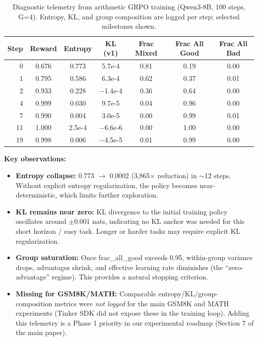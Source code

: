 \documentclass{article}
\begin{document}
\begin{table}[htbp]
    \centering
    \caption{Diagnostic telemetry from arithmetic GRPO training (Qwen3-8B, 100 steps, G=4). Entropy, KL, and group composition are logged per step; selected milestones shown.}
    \begin{tabular}{rcccccc}
        \toprule
        Step & Reward & Entropy & KL (v1) & Frac Mixed & Frac All Good & Frac All Bad \\
        \midrule
        0  & 0.676 & 0.773   & 5.7e-4  & 0.81 & 0.19 & 0.00 \\
        1  & 0.795 & 0.586   & 6.3e-4  & 0.62 & 0.37 & 0.01 \\
        2  & 0.933 & 0.228   & $-$1.4e-4 & 0.36 & 0.64 & 0.00 \\
        4  & 0.999 & 0.030   & 9.7e-5  & 0.04 & 0.96 & 0.00 \\
        7  & 0.990 & 0.004   & 3.0e-5  & 0.00 & 0.99 & 0.01 \\
        11 & 1.000 & 2.5e-4  & $-$6.6e-6 & 0.00 & 1.00 & 0.00 \\
        19 & 0.998 & 0.006   & $-$4.5e-5 & 0.01 & 0.99 & 0.00 \\
        \bottomrule
    \end{tabular}
    \label{tab:diagnostics}
\end{table}

\textbf{Key observations:}
\begin{itemize}
    \item \textbf{Entropy collapse:} 0.773 $\rightarrow$ 0.0002 (3,865$\times$ reduction) in $\sim$12 steps. Without explicit entropy regularization, the policy becomes near-deterministic, which limits further exploration.
    \item \textbf{KL remains near zero:} KL divergence to the initial training policy oscillates around $\pm$0.001 nats, indicating no KL anchor was needed for this short horizon / easy task. Longer or harder tasks may require explicit KL regularization.
    \item \textbf{Group saturation:} Once frac\_all\_good exceeds 0.95, within-group variance drops, advantages shrink, and effective learning rate diminishes (the ``zero-advantage'' regime). This provides a natural stopping criterion.
    \item \textbf{Missing for GSM8K/MATH:} Comparable entropy/KL/group-composition metrics were \emph{not logged} for the main GSM8K and MATH experiments (Tinker SDK did not expose these in the training loop). Adding this telemetry is a Phase 1 priority in our experimental roadmap (Section 7 of the main paper).
\end{itemize}
\end{document}
